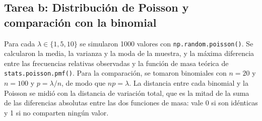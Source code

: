 \documentclass[11pt,letterpaper]{article}
\begin{document}
\subsection{Tarea b: Distribución de Poisson y comparación con la binomial}

Para cada $\lambda \in \{1, 5, 10\}$ se simularon 1000 valores con \texttt{np.random.poisson()}. Se calcularon la media, la varianza y la moda de la muestra, y la máxima diferencia entre las frecuencias relativas observadas y la función de masa teórica de \texttt{stats.poisson.pmf()}. Para la comparación, se tomaron binomiales con $n = 20$ y $n = 100$ y $p = \lambda/n$, de modo que $np = \lambda$. La distancia entre cada binomial y la Poisson se midió con la distancia de variación total, que es la mitad de la suma de las diferencias absolutas entre las dos funciones de masa: vale 0 si son idénticas y 1 si no comparten ningún valor.
\end{document}
